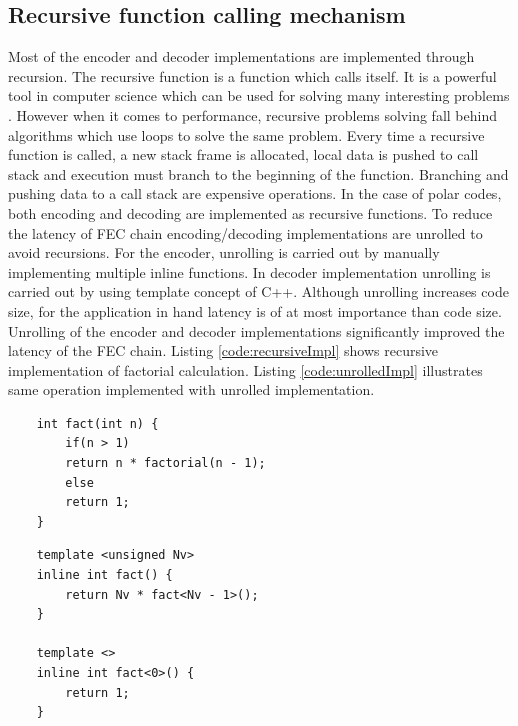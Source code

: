 \subsection{Recursive function calling mechanism}
Most of the encoder and decoder implementations are implemented through recursion. The recursive function is a function which calls itself. It is a powerful tool in computer science which can be used for solving many interesting problems \cite{CLRS}. However when it comes to performance, recursive problems solving fall behind algorithms which use loops to solve the same problem. Every time a recursive function is called, a new stack frame is allocated, local data is pushed to call stack and execution must branch to the beginning of the function. Branching and pushing data to a call stack are expensive operations. In the case of polar codes, both encoding and decoding are implemented as recursive functions. To reduce the latency of FEC chain encoding/decoding implementations are unrolled to avoid recursions. For the encoder, unrolling is carried out by manually implementing multiple inline functions. In decoder implementation unrolling is carried out by using template concept of C++. Although unrolling increases code size, for the application in hand latency is of at most importance than code size. Unrolling of the encoder and decoder implementations significantly improved the latency of the FEC chain. Listing \ref{code:recursiveImpl} shows recursive implementation of factorial calculation. Listing \ref{code:unrolledImpl} illustrates same operation implemented with unrolled implementation. 

\begin{code}
	\label{code:recursiveImpl}
	\begin{verbatim}
	int fact(int n) {
		if(n > 1)
		return n * factorial(n - 1);
		else
		return 1;
	}
	\end{verbatim}
\end{code}

\begin{code}
	\label{code:unrolledImpl}
	\begin{verbatim}
	template <unsigned Nv>
	inline int fact() {
		return Nv * fact<Nv - 1>();
	}
	
	template <>
	inline int fact<0>() {
		return 1;
	}	
	\end{verbatim}
\end{code}